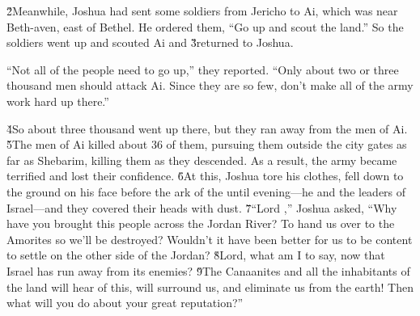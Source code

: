 \v{2}Meanwhile, Joshua had sent some soldiers from Jericho to Ai, which was near Beth-aven, east of Bethel. He ordered them, ``Go up and scout the land.'' So the soldiers went up and scouted Ai and \v{3}returned to Joshua.

``Not all of the people need to go up,'' they reported. ``Only about two or three thousand men should attack Ai. Since they are so few, don't make all of the army work hard up there.''

\v{4}So about three thousand went up there, but they ran away from the men of Ai. \v{5}The men of Ai killed about 36 of them, pursuing them outside the city gates as far as Shebarim, killing them as they descended. As a result, the army became terrified and lost their confidence. \v{6}At this, Joshua tore his clothes, fell down to the ground on his face before the ark of the  until evening---he and the leaders of Israel---and they covered their heads with dust. \v{7}``Lord ,'' Joshua asked, ``Why have you brought this people across the Jordan River? To hand us over to the Amorites so we'll be destroyed? Wouldn't it have been better for us to be content to settle on the other side of the Jordan? \v{8}Lord, what am I to say, now that Israel has run away from its enemies? \v{9}The Canaanites and all the inhabitants of the land will hear of this, will surround us, and eliminate us from the earth! Then what will you do about your great reputation?''

